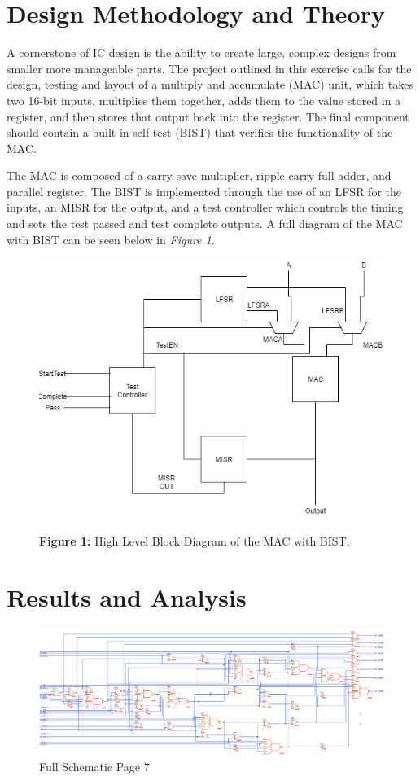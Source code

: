 \documentclass[11pt]{article}
\begin{document}
\section{Design Methodology and Theory}

	A cornerstone of IC design is the ability to create large, complex designs from smaller more manageable parts. The project outlined in this exercise calls for the design, testing and layout of a multiply and accumulate (MAC) unit, which takes two 16-bit inputs, multiplies them together, adds them to the value stored in a register, and then stores that output back into the register. The final component should contain a built in self test (BIST) that verifies the functionality of the MAC.
	
	The MAC is composed of a carry-save multiplier, ripple carry full-adder, and parallel register. The BIST is implemented through the use of an LFSR for the inputs, an MISR for the output, and a test controller which controls the timing and sets the test passed and test complete outputs. A full diagram of the MAC with BIST can be seen below in \textit{Figure 1}.
	
	\begin{figure}
		\centering
		\includegraphics[width=0.7\linewidth]{Pictures/Full-Project-Block}
		\caption{\textbf{Figure 1: } High Level Block Diagram of the MAC with BIST.}
		\label{fig:full-project-block}
	\end{figure}
	

	

\section{Results and Analysis}
		
	\begin{figure}[H] 
		\centering 
		\includegraphics[width=0.7\linewidth]{"Pictures/Full Schematic Page 7"}
		\caption{Full Schematic Page 7} 
		\label{fig:Full-Schematic-Page-7} 
	\end{figure}
	
\end{document}
